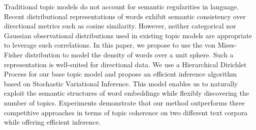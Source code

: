 Traditional topic models do not account for semantic regularities in language. Recent distributional representations of words exhibit semantic consistency over directional metrics such as cosine similarity. However, neither categorical nor Gaussian observational distributions used in existing topic models are appropriate to leverage such correlations. In this paper, we propose to use the von Mises-Fisher distribution to model the density of words over a unit sphere. Such a representation is well-suited for directional data. We use a Hierarchical Dirichlet Process for our base topic model and propose an efficient inference algorithm based on Stochastic Variational Inference. This model enables us to naturally exploit the semantic structures of word embeddings while flexibly discovering the number of topics. Experiments demonstrate that our method outperforms three competitive approaches in terms of topic coherence on two different text corpora while offering efficient inference.
